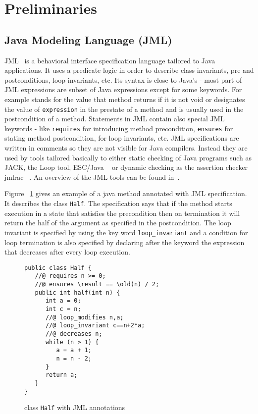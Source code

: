 \section{Preliminaries}
\subsection{Java Modeling Language (JML)} 
JML~\cite{JMLRefMan} is a behavioral interface specification language tailored to Java applications. It uses a predicate logic in order to describe class invariants, pre and postconditions, loop invariants, etc. Its syntax is close to Java's - most part of JML expressions are subset of Java expressions except for some keywords. For example  stands for the value that method returns if it is not void or  designates the value of \texttt{expression} in the prestate of a method and is usually used in the postcondition of a method. Statements in JML contain also special JML keywords - like \texttt{requires} for introducing method precondition, \texttt{ensures} for stating method postcondition,  for loop invariants, etc. JML specifications are written in comments so they are not visible for Java compilers. Instead they are used by tools tailored basically to either static checking of Java programs such as JACK, the Loop tool, ESC/Java ~\cite{escjava} or dynamic checking as the assertion checker jmlrac ~\cite{jmlrac}. An overview of the JML tools can be found in~\cite{BurdyCCEKLLP03}.

Figure ~\ref{halfSrc} gives an example of a java method annotated with JML specification.     
It describes the class \texttt{Half}.
The specification says that if the method starts execution in a state that satisfies the precondition then on termination it will return the half of the argument as specified in the postcondition. The loop invariant is specified by using the key word \texttt{loop\_invariant} and a condition for loop termination is also specified by declaring after the keyword  the expression that decreases after every loop execution. 
\begin{figure}
\begin{verbatim}
public class Half {	
   //@ requires n >= 0;
   //@ ensures \result == \old(n) / 2; 	 
   public int half(int n) {
      int a = 0;
      int c = n;
      //@ loop_modifies n,a;
      //@ loop_invariant c==n+2*a;
      //@ decreases n;
      while (n > 1) {
         a = a + 1;
         n = n - 2;
      }
      return a;
   }
}
\end{verbatim}
\caption{class \texttt{Half} with JML annotations} 
\label{halfSrc}
\end{figure}
